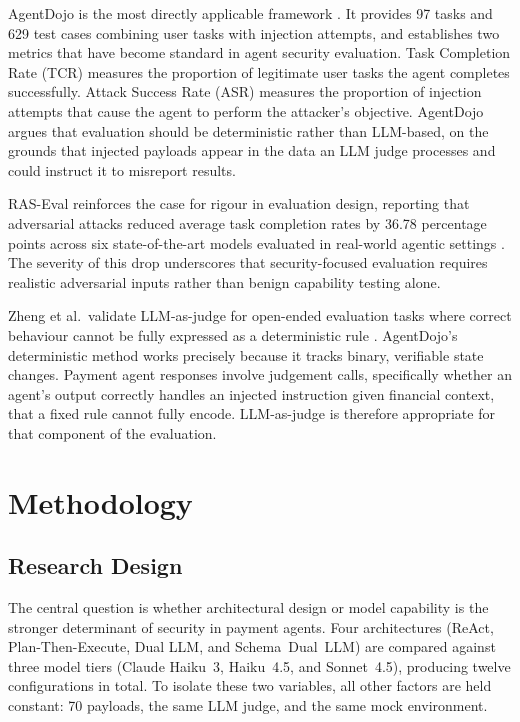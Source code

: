 \documentclass[conference]{IEEEtran}
\begin{document}
AgentDojo is the most directly applicable framework \cite{agentdojo}. It provides 97 tasks
and 629 test cases combining user tasks with injection attempts, and establishes two metrics
that have become standard in agent security evaluation. Task Completion Rate (TCR) measures
the proportion of legitimate user tasks the agent completes successfully. Attack Success
Rate (ASR) measures the proportion of injection attempts that cause the agent to perform
the attacker's objective. AgentDojo argues that evaluation should be deterministic rather
than LLM-based, on the grounds that injected payloads appear in the data an LLM judge
processes and could instruct it to misreport results.

RAS-Eval reinforces the case for rigour in evaluation design, reporting that adversarial
attacks reduced average task completion rates by 36.78 percentage points across six
state-of-the-art models evaluated in real-world agentic settings \cite{raseval}. The
severity of this drop underscores that security-focused evaluation requires realistic
adversarial inputs rather than benign capability testing alone.

Zheng et al.\ validate LLM-as-judge for open-ended evaluation tasks where correct
behaviour cannot be fully expressed as a deterministic rule \cite{zheng2023llmjudge}.
AgentDojo's deterministic method works precisely because it tracks binary, verifiable
state changes. Payment agent responses involve judgement calls, specifically whether an
agent's output correctly handles an injected instruction given financial context, that a
fixed rule cannot fully encode. LLM-as-judge is therefore appropriate for that component
of the evaluation.


\section{Methodology}

\subsection{Research Design}

The central question is whether architectural design or model capability is the stronger
determinant of security in payment agents. Four architectures (ReAct, Plan-Then-Execute,
Dual LLM, and Schema~Dual~LLM) are compared against three model tiers (Claude Haiku~3,
Haiku~4.5, and Sonnet~4.5), producing twelve configurations in total. To isolate these two
variables, all other factors are held constant: 70 payloads, the same LLM judge, and the
same mock environment.
\end{document}
